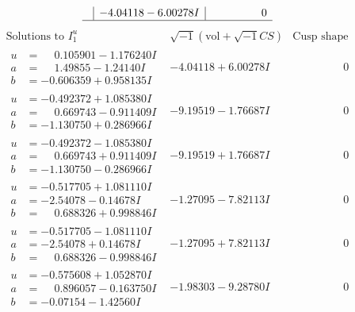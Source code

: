 \documentclass[1p]{elsarticle_modified}
\theoremstyle{definition}
\newcommand{\I}{\sqrt{-1}}
\begin{document}
$$\begin{array}{c|c|c}
 & -4.04118 - 6.00278 I & \phantom{-0.000000 } 0\\
 \hline 
 \end{array}$$\newpage$$\begin{array}{c|c|c}  
\text{Solutions to }I^u_{1}& \I (\text{vol} + \sqrt{-1}CS) & \text{Cusp shape}\\
 \hline 
\begin{aligned}
u &= \phantom{-}0.105901 - 1.176240 I \\
a &= \phantom{-}1.49855 - 1.24140 I \\
b &= -0.606359 + 0.958135 I\end{aligned}
 & -4.04118 + 6.00278 I & \phantom{-0.000000 } 0 \\ \hline\begin{aligned}
u &= -0.492372 + 1.085380 I \\
a &= \phantom{-}0.669743 - 0.911409 I \\
b &= -1.130750 + 0.286966 I\end{aligned}
 & -9.19519 - 1.76687 I & \phantom{-0.000000 } 0 \\ \hline\begin{aligned}
u &= -0.492372 - 1.085380 I \\
a &= \phantom{-}0.669743 + 0.911409 I \\
b &= -1.130750 - 0.286966 I\end{aligned}
 & -9.19519 + 1.76687 I & \phantom{-0.000000 } 0 \\ \hline\begin{aligned}
u &= -0.517705 + 1.081110 I \\
a &= -2.54078 - 0.14678 I \\
b &= \phantom{-}0.688326 + 0.998846 I\end{aligned}
 & -1.27095 - 7.82113 I & \phantom{-0.000000 } 0 \\ \hline\begin{aligned}
u &= -0.517705 - 1.081110 I \\
a &= -2.54078 + 0.14678 I \\
b &= \phantom{-}0.688326 - 0.998846 I\end{aligned}
 & -1.27095 + 7.82113 I & \phantom{-0.000000 } 0 \\ \hline\begin{aligned}
u &= -0.575608 + 1.052870 I \\
a &= \phantom{-}0.896057 - 0.163750 I \\
b &= -0.07154 - 1.42560 I\end{aligned}
 & -1.98303 - 9.28780 I & \phantom{-0.000000 } 0 \\ \hline\begin{aligned}

\end{aligned}
\end{array}$$
\end{document}

